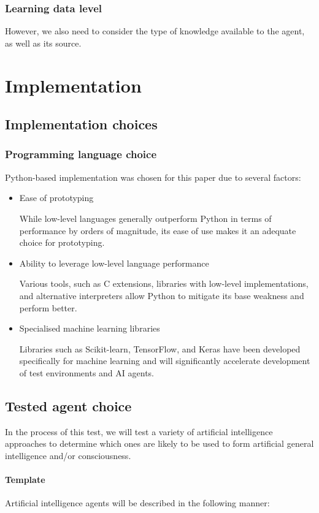 \documentclass[masterthesis]{fer}
\begin{document}
\subsection{Learning data level}
However, we also need to consider the type of knowledge available to the agent, as well as its source.



\chapter{Implementation}

\section{Implementation choices}
\subsection{Programming language choice}
Python-based implementation was chosen for this paper due to several factors:
\begin{itemize}
\item Ease of prototyping

While low-level languages generally outperform Python in terms of performance by orders of magnitude, its ease of use makes it an adequate choice for prototyping.
\item Ability to leverage low-level language performance

Various tools, such as C extensions, libraries with low-level implementations, and alternative interpreters allow Python to mitigate its base weakness and perform better.
\item Specialised machine learning libraries

Libraries such as Scikit-learn, TensorFlow, and Keras have been developed specifically for machine learning and will significantly accelerate development of test environments and AI agents.
\end{itemize}
\section{Tested agent choice}
In the process of this test, we will test a variety of artificial intelligence approaches to determine which ones are likely to be used to form artificial general intelligence and/or consciousness.
\subsubsection{Template}
Artificial intelligence agents will be described in the following manner:
\end{document}
